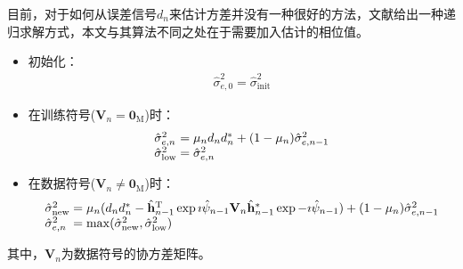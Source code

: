 目前，对于如何从误差信号$d_n$来估计方差并没有一种很好的方法，文献给出一种递归求解方式，本文与其算法不同之处在于需要加入估计的相位值。
\begin{itemize}
    \item \heiti 初始化：\begin{eqnarray}
            \hat{\sigma}_{e,0}^2=\hat{\sigma}_{\mathrm{init}}^2
            \label{equ:4.26}
        \end{eqnarray}
    \item 在训练符号($\mathbf{V}_n=\mathbf{0}_{\mathrm{M}}$)时：
        \begin{eqnarray}
            \begin{array}{l@{\;=\;}l}
                \hat{\sigma}_{e,n}^2&\mu_{n}
                d_nd_n^*+(1-\mu_{n})\hat{\sigma}_{e,n-1}^2\\
                \hat{\sigma}_{\mathrm{low}}^2&\hat{\sigma}_{e,n}^2
            \end{array}
            \label{equ:4.27}
        \end{eqnarray}
    \item 在数据符号($\mathbf{V}_n\neq
        \mathbf{0}_{\mathrm{M}}$)时：
        \begin{eqnarray}
            \begin{array}{l@{\;=\;}l}
                \hat{\sigma}_{\mathrm{new}}^2&\mu_{n}(d_nd_n^*-\hat{\mathbf{h}}^{\mathrm{T}}_{n-1}\exp{\imath\hat{\psi}_{n-1}}\mathbf{V}_n\hat{\mathbf{h}}_{n-1}^*\exp{-\imath\hat{\psi}_{n-1}})+(1-\mu_{n})\hat{\sigma}_{e,n-1}^2\\
                \hat{\sigma}_{e,n}^2&\max(\hat{\sigma}_{\mathrm{new}}^2,\hat{\sigma}_{\mathrm{low}}^2)
            \end{array}
            \label{equ:4.28}
        \end{eqnarray}
\end{itemize}
其中，$\mathbf{V}_n$为数据符号的协方差矩阵。
